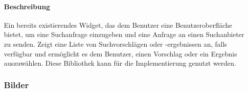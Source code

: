 \paragraph*{Beschreibung}
Ein bereits existierendes Widget, das dem Benutzer eine Benutzeroberfläche bietet, um eine Suchanfrage einzugeben und eine Anfrage an einen Suchanbieter zu senden. 
Zeigt eine Liste von Suchvorschlägen oder -ergebnissen an, falls verfügbar 
und ermöglicht es dem Benutzer, einen Vorschlag oder ein Ergebnis auszuwählen.
Diese Bibliothek kann für die Implementierung genutzt werden.

\subsubsection*{Bilder}\label{App_Search_SearchScreen_Bilder}
\begin{minipage}{\linewidth}
    \centering
    \begin{minipage}{.49\textwidth}
        \captionsetup[figure]{labelformat=empty}
        \captionsetup[figure]{labelformat=default}
    \end{minipage}
\end{minipage}